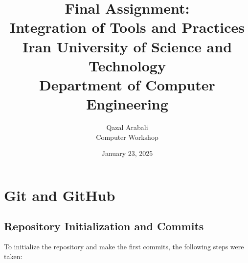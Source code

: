 \documentclass[12pt]{article}
\title{
    \vspace{2in}
    \textbf{Final Assignment:}\\
    \textbf{Integration of Tools and Practices}\\
    \large Iran University of Science and Technology\\
    \large Department of Computer Engineering\\
    \vspace{2in}
}
\author{
    \vspace{0.5in}
    Qazal Arabali\\
    Computer Workshop\\
    \vspace{0.5in}
}
\date{January 23, 2025}
\begin{document}
\begin{titlepage}
    \maketitle
    \thispagestyle{empty}
\end{titlepage}

\newpage

\tableofcontents
\newpage

\section{Git and GitHub}
    \subsection{Repository Initialization and Commits}
    
To initialize the repository and make the first commits, the following steps were taken:
\end{document}
